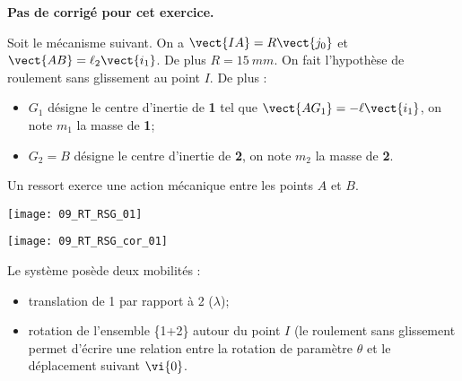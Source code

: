 \normalfalse \difficiletrue \tdifficilefalse
\correctiontrue

\setcounter{question}{0}
\ifcorrection
\else
\textbf{Pas de corrigé pour cet exercice.}
\fi

\ifprof
\else
Soit le mécanisme suivant. On a $\vect{IA}=R\vect{j_0}$ et $\vect{AB}=\ell_2\vect{i_1}$. De plus $R=\SI{15}{mm}$.
On fait l'hypothèse de roulement sans glissement au point $I$. De plus :
\begin{itemize}
\item $G_1$ désigne le centre d'inertie de \textbf{1} tel que $\vect{AG_1}=-\ell\vect{i_1}$, on note $m_1$ la masse de \textbf{1};%
\item $G_2=B$ désigne le centre d'inertie de \textbf{2}, on note $m_2$ la masse de \textbf{2}.%
\end{itemize}
Un ressort exerce une action mécanique entre les points $A$ et $B$. 
\begin{center}
\texttt{[image: 09\_RT\_RSG\_01]}
\end{center}
\fi

\ifprof
\begin{center}
\texttt{[image: 09\_RT\_RSG\_cor\_01]}
\end{center}

\else
\fi

\ifprof
Le système posède deux mobilités : 
\begin{itemize}
\item translation de 1 par rapport à 2 ($\lambda$);
\item rotation de l'ensemble \{1+2\} autour du point $I$ (le roulement sans glissement permet d'écrire une relation entre la rotation de paramètre $\theta$ et le déplacement suivant $\vi{0}$.
\end{itemize}

